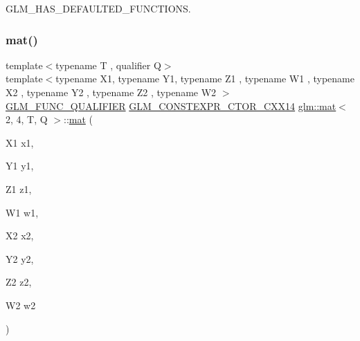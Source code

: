 G\+L\+M\+\_\+\+H\+A\+S\+\_\+\+D\+E\+F\+A\+U\+L\+T\+E\+D\+\_\+\+F\+U\+N\+C\+T\+I\+O\+NS. 

\mbox{\label{structglm_1_1mat_3_012_00_014_00_01_t_00_01_q_01_4_a6d81f6d524f14f933d44911cc8049b01}} 
\subsubsection{\texorpdfstring{mat()}{mat()}\hspace{0.1cm}{\footnotesize\ttfamily [19/21]}}
{\footnotesize\ttfamily template$<$typename T , qualifier Q$>$ \\
template$<$typename X1, typename Y1, typename Z1 , typename W1 , typename X2 , typename Y2 , typename Z2 , typename W2 $>$ \\
\hyperlink{setup_8hpp_a33fdea6f91c5f834105f7415e2a64407}{G\+L\+M\+\_\+\+F\+U\+N\+C\+\_\+\+Q\+U\+A\+L\+I\+F\+I\+ER} \hyperlink{setup_8hpp_a0900f9145e68bf6061b6f5e7be3fa751}{G\+L\+M\+\_\+\+C\+O\+N\+S\+T\+E\+X\+P\+R\+\_\+\+C\+T\+O\+R\+\_\+\+C\+X\+X14} \hyperlink{structglm_1_1mat}{glm\+::mat}$<$ 2, 4, T, Q $>$\+::\hyperlink{structglm_1_1mat}{mat} (\begin{DoxyParamCaption}\item[{X1}]{x1,  }\item[{Y1}]{y1,  }\item[{Z1}]{z1,  }\item[{W1}]{w1,  }\item[{X2}]{x2,  }\item[{Y2}]{y2,  }\item[{Z2}]{z2,  }\item[{W2}]{w2 }\end{DoxyParamCaption})}

\mbox{\label{structglm_1_1mat_3_012_00_014_00_01_t_00_01_q_01_4_a727b28490a4fbcaa1cf57cc335d1205d}} 
